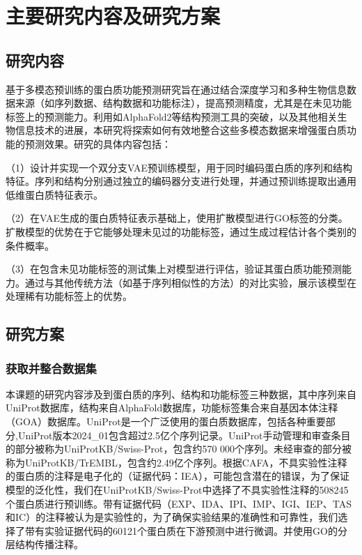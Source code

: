 

\chapter{主要研究内容及研究方案}

\section{研究内容}
基于多模态预训练的蛋白质功能预测研究旨在通过结合深度学习和多种生物信息数据来源（如序列数据、结构数据和功能标注），提高预测精度，尤其是在未见功能标签上的预测能力。利用如AlphaFold2等结构预测工具的突破，以及其他相关生物信息技术的进展，本研究将探索如何有效地整合这些多模态数据来增强蛋白质功能的预测效果。研究的具体内容包括：

（1）设计并实现一个双分支VAE\cite{kingma2013auto}预训练模型，用于同时编码蛋白质的序列和结构特征。序列和结构分别通过独立的编码器分支进行处理，并通过预训练提取出通用低维蛋白质特征表示。

（2）在VAE生成的蛋白质特征表示基础上，使用扩散模型进行GO标签的分类。扩散模型的优势在于它能够处理未见过的功能标签，通过生成过程估计各个类别的条件概率。

（3）在包含未见功能标签的测试集上对模型进行评估，验证其蛋白质功能预测能力。通过与其他传统方法（如基于序列相似性的方法）的对比实验，展示该模型在处理稀有功能标签上的优势。

\section{研究方案}
\subsection{获取并整合数据集}
本课题的研究内容涉及到蛋白质的序列、结构和功能标签三种数据，其中序列来自UniProt数据库\cite{uniprot2023uniprot}，结构来自AlphaFold数据库\cite{varadi2022alphafold}，功能标签集合来自基因本体注释（GOA）数据库\cite{huntley2015goa}。UniProt是一个广泛使用的蛋白质数据库，包括各种重要部分,UniProt版本2024\_01包含超过2.5亿个序列记录。UniProt手动管理和审查条目的部分被称为UniProtKB/Swiss-Prot\cite{boutet2016uniprotkb}，包含约570 000个序列。未经审查的部分被称为UniProtKB/TrEMBL，包含约2.49亿个序列。根据CAFA，不具实验性注释的蛋白质的注释是电子化的（证据代码：IEA），可能包含潜在的错误，为了保证模型的泛化性，我们在UniProtKB/Swiss-Prot中选择了不具实验性注释的508245个蛋白质进行预训练。带有证据代码（EXP、IDA、IPI、IMP、IGI、IEP、TAS和IC）的注释被认为是实验性的，为了确保实验结果的准确性和可靠性，我们选择了带有实验证据代码的60121个蛋白质在下游预测中进行微调。并使用GO\cite{ashburner2000gene}的分层结构传播注释。

